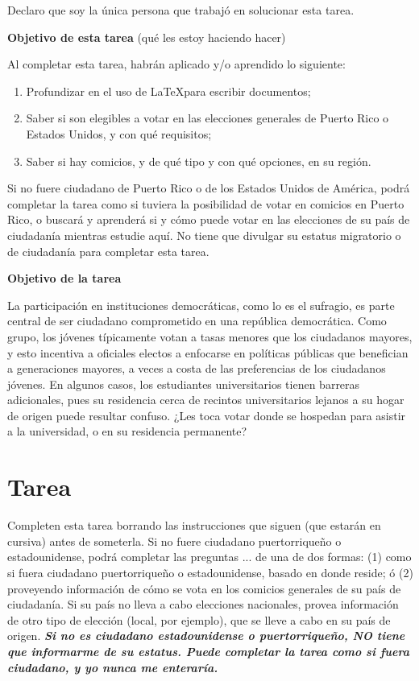 \documentclass[11pt]{article} %
\begin{document}
Declaro que soy la única persona que trabajó en solucionar esta tarea.
\newpage

\textbf{Objetivo de esta tarea} (qué les estoy haciendo hacer)

Al completar esta tarea, habrán aplicado y/o aprendido lo siguiente:
\begin{enumerate}
    \item Profundizar en el uso de \LaTeX para escribir documentos;
    \item Saber si son elegibles a votar en las elecciones generales de Puerto Rico o Estados Unidos, y con qué requisitos;
    \item Saber si hay comicios, y de qué tipo y con qué opciones, en su región.
\end{enumerate}

Si no fuere ciudadano de Puerto Rico o de los Estados Unidos de América, podrá completar la tarea como si tuviera la posibilidad de votar en comicios en Puerto Rico, o buscará y aprenderá si y cómo puede votar en las elecciones de su país de ciudadanía mientras estudie aquí. No tiene que divulgar su estatus migratorio o de ciudadanía para completar esta tarea.

\textbf{Objetivo de la tarea}

La participación en instituciones democráticas, como lo es el sufragio, es parte central de ser ciudadano comprometido en una república democrática. Como grupo, los jóvenes típicamente votan a tasas menores que los ciudadanos mayores, y esto incentiva a oficiales electos a enfocarse en políticas públicas que benefician a generaciones mayores, a veces a costa de las preferencias de los ciudadanos jóvenes. En algunos casos, los estudiantes universitarios tienen barreras adicionales, pues su residencia cerca de recintos universitarios lejanos a su hogar de origen puede resultar confuso. ¿Les toca votar donde se hospedan para asistir a la universidad, o en su residencia permanente? 

\section*{Tarea}

Completen esta tarea borrando las instrucciones que siguen (que estarán en cursiva) antes de someterla. Si no fuere ciudadano puertorriqueño o estadounidense, podrá completar las preguntas ... de una de dos formas: (1) como si fuera ciudadano puertorriqueño o estadounidense, basado en donde reside; ó (2) proveyendo información de cómo se vota en los comicios generales de su país de ciudadanía. Si su país no lleva a cabo elecciones nacionales, provea información de otro tipo de elección (local, por ejemplo), que se lleve a cabo en su país de origen. \textbf{\textit{Si no es ciudadano estadounidense o puertorriqueño, NO tiene que informarme de su estatus. Puede completar la tarea como si fuera ciudadano, y yo nunca me enteraría.}}
\end{document}
